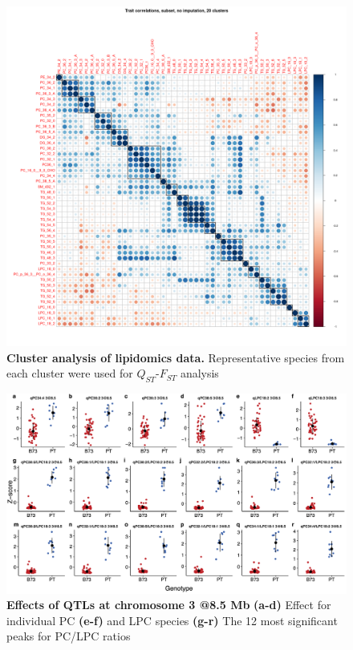 \begin{subappendices}
\begin{figure}[t]
\begin{center}
\includegraphics[width=\linewidth]{Sup_Figures/Sup_Fig_1.png}
\caption[Cluster analysis of lipidomics data]{\textbf{Cluster analysis of lipidomics data.} Representative species from each cluster were used for $Q_{ST}$-$F_{ST}$ analysis}
\label{figure:Sup:lipid_clusters}
\end{center}
\end{figure} 
\clearpage

\begin{figure}[t]
\begin{center}
\includegraphics[width=\linewidth]{Sup_Figures/Sup_Fig_2.png}
\caption[Effects of QTLs at chromosome 3 @8.5 Mb]{\textbf{Effects of QTLs at chromosome 3 @8.5 Mb} \textbf{(a-d)} Effect for individual PC \textbf{(e-f)} and LPC species
\textbf{(g-r)} The 12 most significant peaks for PC/LPC ratios} 
\label{figure:Sup:QTL_effect_sp}
\end{center}
\end{figure}  
\clearpage


\end{subappendices}

